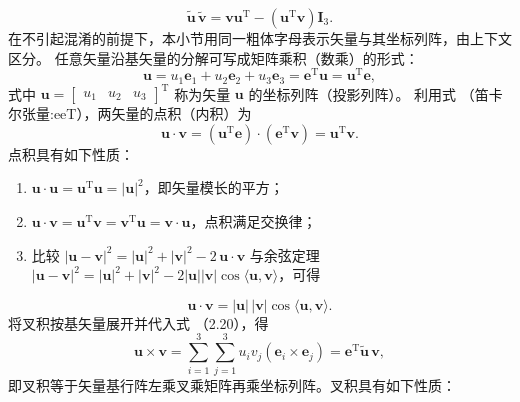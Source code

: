 \[
\tilde{\boldsymbol{u}}\,\tilde{\boldsymbol{v}} = \boldsymbol{v}\boldsymbol{u}^{\mathrm{T}} - \left(\boldsymbol{u}^{\mathrm{T}}\boldsymbol{v}\right)\boldsymbol{I}_3.
\]
在不引起混淆的前提下，本小节用同一粗体字母表示矢量与其坐标列阵，由上下文区分。
任意矢量沿基矢量的分解可写成矩阵乘积（数乘）的形式：
\[
\boldsymbol{u} = u_1\mathbf{e}_1 + u_2\mathbf{e}_2 + u_3\mathbf{e}_3
= \boldsymbol{e}^{\mathrm{T}}\boldsymbol{u} = \boldsymbol{u}^{\mathrm{T}}\boldsymbol{e},
\]
式中 $\boldsymbol{u} = \begin{bmatrix} u_1 & u_2 & u_3 \end{bmatrix}^{\mathrm{T}}$ 称为矢量 $\boldsymbol{u}$ 的坐标列阵（投影列阵）。
利用式 （笛卡尔张量:eeT），两矢量的点积（内积）为
\[
\boldsymbol{u}\cdot\boldsymbol{v}
= \left(\boldsymbol{u}^{\mathrm{T}}\boldsymbol{e}\right)\cdot\left(\boldsymbol{e}^{\mathrm{T}}\boldsymbol{v}\right)
= \boldsymbol{u}^{\mathrm{T}}\boldsymbol{v}.
\]
点积具有如下性质：
\begin{enumerate}

\item $\boldsymbol{u}\cdot\boldsymbol{u} = \boldsymbol{u}^{\mathrm{T}}\boldsymbol{u} = |\boldsymbol{u}|^2$，即矢量模长的平方；

\item $\boldsymbol{u}\cdot\boldsymbol{v} = \boldsymbol{u}^{\mathrm{T}}\boldsymbol{v} = \boldsymbol{v}^{\mathrm{T}}\boldsymbol{u} = \boldsymbol{v}\cdot\boldsymbol{u}$，点积满足交换律；

\item 比较 $|\boldsymbol{u}-\boldsymbol{v}|^2 = |\boldsymbol{u}|^2 + |\boldsymbol{v}|^2 - 2\,\boldsymbol{u}\cdot\boldsymbol{v}$ 与余弦定理 $|\boldsymbol{u}-\boldsymbol{v}|^2 = |\boldsymbol{u}|^2 + |\boldsymbol{v}|^2 - 2|\boldsymbol{u}||\boldsymbol{v}|\cos\langle\boldsymbol{u},\boldsymbol{v}\rangle$，可得

\end{enumerate}
\[
\boldsymbol{u}\cdot\boldsymbol{v} = |\boldsymbol{u}|\,|\boldsymbol{v}|\cos\langle\boldsymbol{u},\boldsymbol{v}\rangle.
\]
将叉积按基矢量展开并代入式 （2.20），得
\[
\boldsymbol{u}\times\boldsymbol{v}
= \sum_{i=1}^{3}\sum_{j=1}^{3} u_i v_j \left(\mathbf{e}_i\times\mathbf{e}_j\right)
= \boldsymbol{e}^{\mathrm{T}}\tilde{\boldsymbol{u}}\,\boldsymbol{v},
\]
即叉积等于矢量基行阵左乘叉乘矩阵再乘坐标列阵。叉积具有如下性质：
